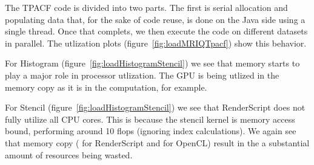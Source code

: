 The TPACF code is divided into two parts.
The first is serial allocation and populating data
  that, for the sake of code reuse, is done on the 
  Java side using a single thread.
Once that complets, we then execute the code on different datasets in parallel.
The utlization plots (figure~\ref{fig:loadMRIQTpacf}) show this behavior.  

For Histogram (figure~\ref{fig:loadHistogramStencil}) we see that memory starts
  to play a major role in processor utlization.
The GPU is being utlized in the memory copy as it is in the computation, for example.

For Stencil (figure~\ref{fig:loadHistogramStencil}) we see that RenderScript does
  not fully utilize all CPU cores.
This is because the stencil kernel is memory access bound, performing around 10 flops 
  (ignoring index calculations).
We again see that memory copy ( for RenderScript and
   for OpenCL) result in the a substantial amount of resources being
  wasted.

